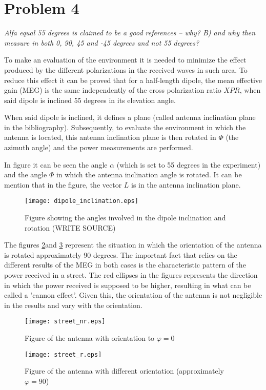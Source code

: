 \section{Problem 4}
\textit{Alfa equal 55 degrees is claimed to be a good references – why? B) and why then measure in both 0, 90, 45 and -45 degrees and not 55 degrees?}

To make an evaluation of the environment it is needed to minimize the effect produced by the different polarizations in the received waves in such area. To reduce this effect it can be proved that for a half-length dipole, the mean effective gain (MEG) is the same independently of the cross polarization ratio $XPR$, when said dipole is inclined 55 degrees in its elevation angle.

When said dipole is inclined, it defines a plane (called antenna inclination plane in the bibliography). Subsequently, to evaluate the environment in which the antenna is located, this antenna inclination plane is then rotated in $\Phi$ (the azimuth angle) and the power measurements are performed.

In figure  it can be seen the angle $\alpha$ (which is set to 55 degrees in the experiment) and the angle $\Phi$ in which the antenna inclination angle is rotated. It can be mention that in the figure, the vector $L$ is in the antenna inclination plane.


\begin{figure}[!h]
  \centering
  \texttt{[image: dipole\_inclination.eps]}
  \caption{Figure showing the angles involved in the dipole inclination and rotation (WRITE SOURCE)}
  \label{fig:dipole_inclination}
\end{figure}

The figures \ref{fig:street_nr}and \ref{fig:street_r} represent the situation in which the orientation of the antenna is rotated approximately 90 degrees. The important fact that relies on the different results of the MEG in both cases is the characteristic pattern of the power received in a street. The red ellipses in the figures represents the direction in which the power received is supposed to be higher, resulting in what can be called a 'cannon effect'. Given this, the orientation of the antenna is not negligible in the results and vary with the orientation.


\begin{figure}[!h]
  \centering
  \texttt{[image: street\_nr.eps]}
  \caption{Figure of the antenna with orientation to $\varphi=0$}
  \label{fig:street_nr}
\end{figure}

\begin{figure}[!h]
  \centering
  \texttt{[image: street\_r.eps]}
  \caption{Figure of the antenna with different orientation (approximately $\varphi=90$)}
  \label{fig:street_r}
\end{figure}

